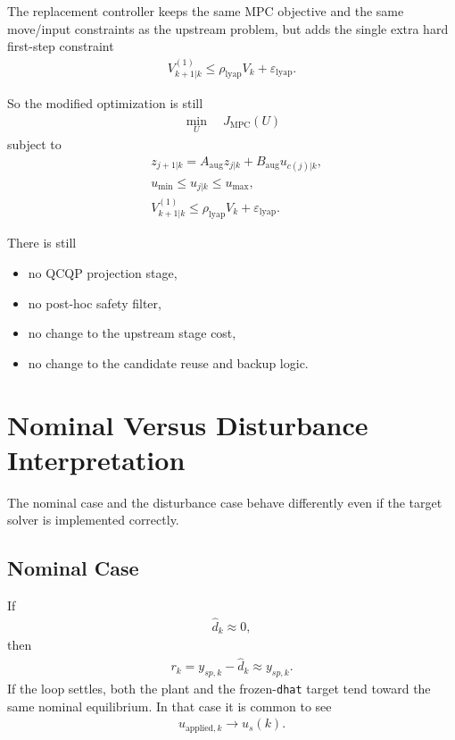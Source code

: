 \documentclass[11pt]{article}
\begin{document}
The replacement controller keeps the same MPC objective and the same move/input constraints as the upstream problem, but adds the single extra hard first-step constraint
\begin{align}
V_{k+1|k}^{(1)} \le \rho_{\mathrm{lyap}} V_k + \varepsilon_{\mathrm{lyap}}.
\end{align}

So the modified optimization is still
\begin{align}
\min_U \quad J_{\mathrm{MPC}}(U)
\end{align}
subject to
\begin{align}
& z_{j+1|k} = A_{\mathrm{aug}} z_{j|k} + B_{\mathrm{aug}} u_{c(j)|k}, \\
& u_{\min} \le u_{j|k} \le u_{\max}, \\
& V_{k+1|k}^{(1)} \le \rho_{\mathrm{lyap}} V_k + \varepsilon_{\mathrm{lyap}}.
\end{align}

There is still
\begin{itemize}
\item no QCQP projection stage,
\item no post-hoc safety filter,
\item no change to the upstream stage cost,
\item no change to the candidate reuse and backup logic.
\end{itemize}

\section{Nominal Versus Disturbance Interpretation}

The nominal case and the disturbance case behave differently even if the target solver is implemented correctly.

\subsection{Nominal Case}

If
\begin{align}
\hat d_k \approx 0,
\end{align}
then
\begin{align}
r_k = y_{sp,k} - \hat d_k \approx y_{sp,k}.
\end{align}
If the loop settles, both the plant and the frozen-\texttt{dhat} target tend toward the same nominal equilibrium. In that case it is common to see
\begin{align}
u_{\mathrm{applied},k} \to u_s(k).
\end{align}
\end{document}
